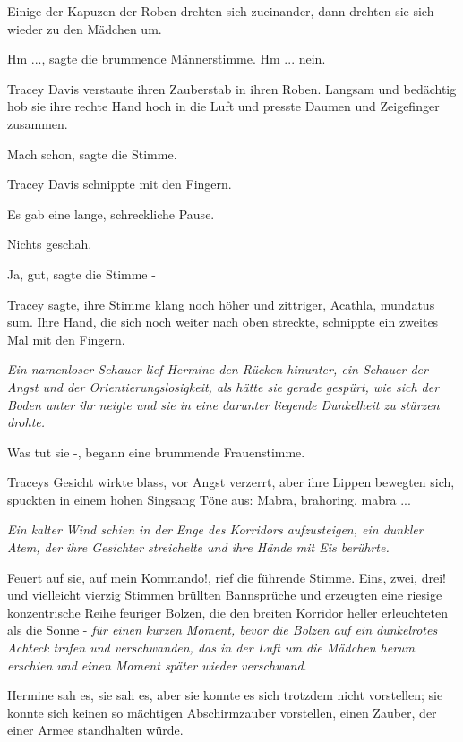 Einige der Kapuzen der Roben drehten sich zueinander, dann drehten sie sich
wieder zu den Mädchen um.

\glqq{}Hm ...\grqq{}, sagte die brummende Männerstimme. \glqq{}Hm ... nein.\grqq{}

Tracey Davis verstaute ihren Zauberstab in ihren Roben. Langsam und bedächtig
hob sie ihre rechte Hand hoch in die Luft und presste Daumen und Zeigefinger
zusammen.

\glqq{}Mach schon\grqq{}, sagte die Stimme.

Tracey Davis schnippte mit den Fingern.

Es gab eine lange, schreckliche Pause.

Nichts geschah.

\glqq{}Ja, gut\grqq{}, sagte die Stimme -

Tracey sagte, ihre Stimme klang noch höher und zittriger, \glqq{}Acathla,
mundatus sum.\grqq{} Ihre Hand, die sich noch weiter nach oben streckte,
schnippte ein zweites Mal mit den Fingern.

\emph{Ein namenloser Schauer lief Hermine den Rücken hinunter, ein Schauer der
Angst und der Orientierungslosigkeit, als hätte sie gerade gespürt, wie sich der
Boden unter ihr neigte und sie in eine darunter liegende Dunkelheit zu stürzen
drohte.}

\glqq{}Was tut sie -\grqq{}, begann eine brummende Frauenstimme.

Traceys Gesicht wirkte blass, vor Angst verzerrt, aber ihre Lippen bewegten
sich, spuckten in einem hohen Singsang Töne aus: \glqq{}Mabra, brahoring, mabra
...\grqq{}

\emph{Ein kalter Wind schien in der Enge des Korridors aufzusteigen, ein dunkler
Atem, der ihre Gesichter streichelte und ihre Hände mit Eis berührte.}

\glqq{}Feuert auf sie, auf mein Kommando!\grqq{}, rief die führende Stimme. \glqq{}
Eins, zwei, drei!\grqq{} und vielleicht vierzig Stimmen brüllten Bannsprüche und
erzeugten eine riesige konzentrische Reihe feuriger Bolzen, die den breiten
Korridor heller erleuchteten als die Sonne - \emph{für einen kurzen Moment,
bevor die Bolzen auf ein dunkelrotes Achteck trafen und verschwanden, das in der
Luft um die Mädchen herum erschien und einen Moment später wieder verschwand}.

Hermine sah es, sie sah es, aber sie konnte es sich trotzdem nicht vorstellen;
sie konnte sich keinen so mächtigen Abschirmzauber vorstellen, einen Zauber, der
einer Armee standhalten würde.

